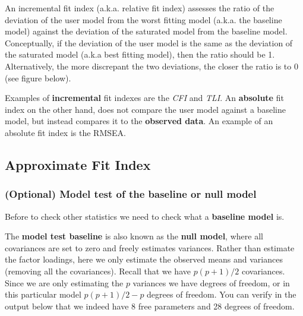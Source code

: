 \documentclass[
]{article}
\begin{document}
An incremental fit index (a.k.a. relative fit index) assesses the ratio
of the deviation of the user model from the worst fitting model (a.k.a.
the baseline model) against the deviation of the saturated model from
the baseline model. Conceptually, if the deviation of the user model is
the same as the deviation of the saturated model (a.k.a best fitting
model), then the ratio should be 1. Alternatively, the more discrepant
the two deviations, the closer the ratio is to 0 (see figure below).

Examples of \textbf{incremental} fit indexes are the \emph{CFI} and
\emph{TLI}. An \textbf{absolute} fit index on the other hand, does not
compare the user model against a baseline model, but instead compares it
to the \textbf{observed data}. An example of an absolute fit index is
the RMSEA.

\hypertarget{approximate-fit-index}{%
\subsection{Approximate Fit Index}\label{approximate-fit-index}}

\hypertarget{optional-model-test-of-the-baseline-or-null-model}{%
\subsubsection{(Optional) Model test of the baseline or null
model}\label{optional-model-test-of-the-baseline-or-null-model}}

Before to check other statistics we need to check what a
\textbf{baseline model} is.

The \textbf{model test baseline} is also known as the \textbf{null
model}, where all covariances are set to zero and freely estimates
variances. Rather than estimate the factor loadings, here we only
estimate the observed means and variances (removing all the
covariances). Recall that we have \(p(p+1)/2\) covariances. Since we are
only estimating the \(p\) variances we have degrees of freedom, or in
this particular model \(p(p+1)/2-p\) degrees of freedom. You can verify
in the output below that we indeed have 8 free parameters and 28 degrees
of freedom.
\end{document}
